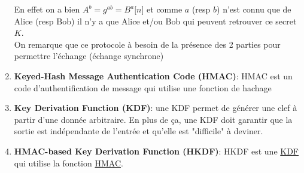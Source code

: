 \documentclass[a4paper, 12pt]{article}
\begin{document}
\begin{enumerate}
\noindent En effet on a bien $A^b = g^{ab} = B^a \lbrack n \rbrack$ et comme $a$ (resp $b$) n'est connu que de Alice (resp Bob) il n'y a que Alice et/ou Bob qui peuvent retrouver ce secret $K$.\\

\noindent On remarque que ce protocole à besoin de la présence des 2 parties pour permettre l'échange (échange synchrone)	
\item \textbf{Keyed-Hash Message Authentication Code (HMAC)}\label{HMAC}: HMAC est un code d'authentification de message qui utilise une fonction de hachage
\item \textbf{Key Derivation Function (KDF)}\label{KDF}: une KDF permet de générer une clef à partir d'une donnée arbitraire. En plus de ça, une KDF doit garantir que la sortie est indépendante de l'entrée et qu'elle est "difficile" à deviner. 
\item \textbf{HMAC-based Key Derivation Function (HKDF)}\label{HKDF}: HKDF est une \hyperref[KDF]{KDF} qui utilise la fonction \hyperref[HMAC]{HMAC}.


\end{enumerate}
\end{document}

